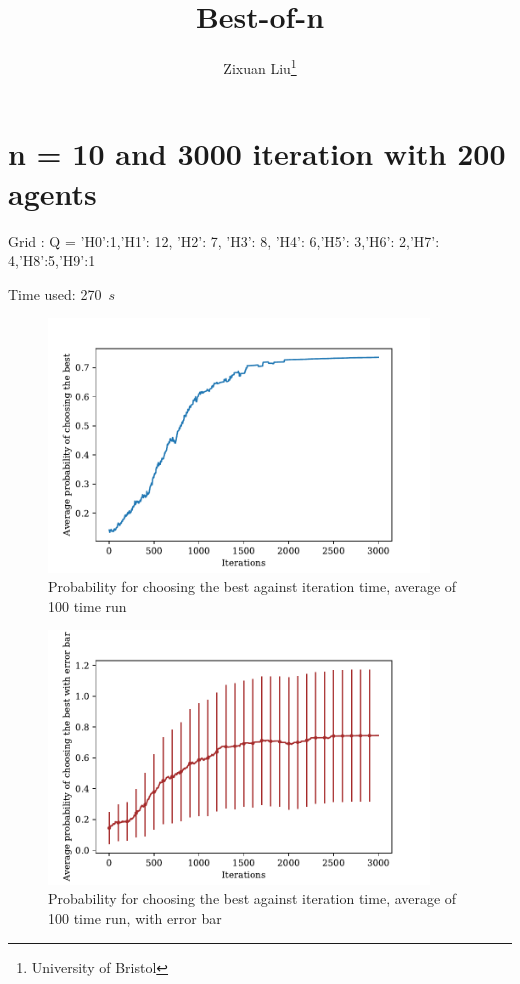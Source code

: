 \documentclass[a4paper,12pt]{article}
\title{Best-of-n}
\author{Zixuan Liu\thanks{University of Bristol}}
\begin{document}
	\maketitle
	\section{n = 10 and 3000 iteration with 200 agents}\label{SRRI}
	Grid : Q = {'H0':1,'H1': 12, 'H2': 7, 'H3': 8, 'H4': 6,'H5': 3,'H6': 2,'H7': 4,'H8':5,'H9':1}
	\graphicspath{{figs/}}
	Time used: 270~${s}$
	\begin{figure}[H]
		\centering
		\includegraphics[width=0.9\textwidth]{Average_pbest200_3000}
		\caption{Probability for choosing the best against iteration time, average of 100 time run}\label{Average_pbest200_3000}
	\end{figure}
%
	\begin{figure}[H]
		\centering
		\includegraphics[width=0.9\textwidth]{Average_pbest_errbar200_3000}
		\caption{Probability for choosing the best against iteration time, average of 100 time run, with error bar}\label{Average_pbest_errbar200_3000}
	\end{figure}
\end{document}
